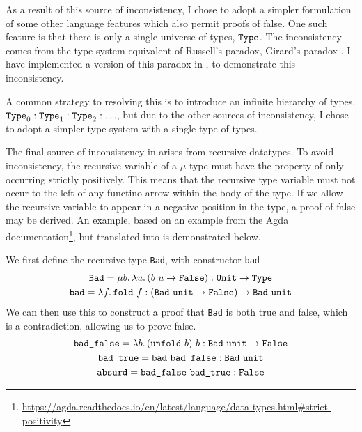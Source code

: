 \documentclass[12pt,a4paper,twoside]{report}
\begin{document}
As a result of this source of inconsistency, I chose to adopt a simpler formulation of some other language features which also permit proofs of false.
One such feature is that there is only a single universe of types, \(\mathtt{Type}\).
The inconsistency comes from the type-system equivalent of Russell's paradox, Girard's paradox \cite{girard72}.
I have implemented a version of this paradox in \pimu{}, to demonstrate this inconsistency.

A common strategy to resolving this is to introduce an infinite hierarchy of types, \(\mathtt{Type}_0 : \mathtt{Type}_1 : \mathtt{Type}_2 : \ldots\), but due to the other sources of inconsistency, I chose to adopt a simpler type system with a single type of types.

The final source of inconsistency in \pimu{} arises from recursive datatypes.
To avoid inconsistency, the recursive variable of a \(\mu\) type must have the property of only occurring strictly positively.
This means that the recursive type variable must not occur to the left of any functino arrow within the body of the type.
If we allow the recursive variable to appear in a negative position in the type, a proof of false may be derived.
An example, based on an example from the Agda documentation\footnote{\url{https://agda.readthedocs.io/en/latest/language/data-types.html\#strict-positivity}}, but translated into \pimu{} is demonstrated below.

We first define the recursive type \texttt{Bad}, with constructor \texttt{bad}
\begin{gather*}
    \texttt{Bad} = \mu b \ldotp \lambda u \ldotp (b\ u \rightarrow \texttt{False}) : \mathtt{Unit} \rightarrow \mathtt{Type} \\
    \texttt{bad} = \lambda f \ldotp \mathtt{fold}\ f : (\texttt{Bad}\ \mathtt{unit} \rightarrow \texttt{False}) \rightarrow \texttt{Bad}\ \mathtt{unit} \\
\end{gather*}
We can then use this to construct a proof that \texttt{Bad} is both true and false, which is a contradiction, allowing us to prove false.
\begin{gather*}
    \texttt{bad\char`_false} = \annot{\fun{b}{\app{(\unfold{b})}{b}}}{\upi{\app{\texttt{Bad}}{\unit}}{\texttt{False}}} \\
    \texttt{bad\char`_true} = \annot{\app{\texttt{bad}}{\texttt{bad\char`_false}}}{\app{\texttt{Bad}}{\unit}} \\
    \texttt{absurd} = \annot{\app{\texttt{bad\char`_false}}{\texttt{bad\char`_true}}}{\texttt{False}} \\
\end{gather*}
\end{document}
